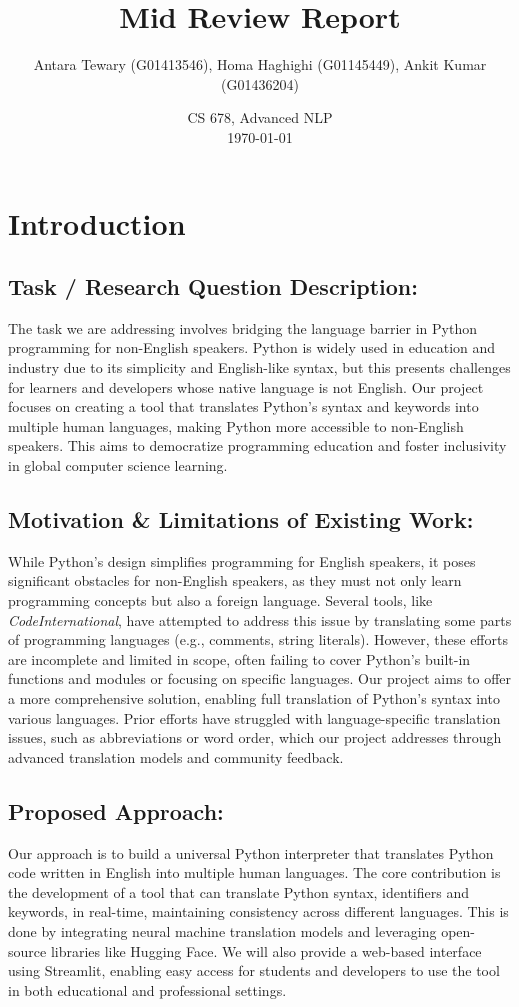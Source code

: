 \documentclass[9pt]{article}
\title{Mid Review Report}
\author{Antara Tewary (G01413546), Homa Haghighi (G01145449), Ankit Kumar (G01436204)}
\date{CS 678, Advanced NLP\\\today}
\begin{document}
\maketitle

\section{Introduction}
\subsection{Task / Research Question Description: }
The task we are addressing involves bridging the language barrier in Python programming for non-English speakers. Python is widely used in education and industry due to its simplicity and English-like syntax, but this presents challenges for learners and developers whose native language is not English. Our project focuses on creating a tool that translates Python's syntax and keywords into multiple human languages, making Python more accessible to non-English speakers. This aims to democratize programming education and foster inclusivity in global computer science learning. 

\subsection{Motivation \& Limitations of Existing Work: }
While Python's design simplifies programming for English speakers, it poses significant obstacles for non-English speakers, as they must not only learn programming concepts but also a foreign language. Several tools, like \textit{CodeInternational}, have attempted to address this issue by translating some parts of programming languages (e.g., comments, string literals). However, these efforts are incomplete and limited in scope, often failing to cover Python's built-in functions and modules or focusing on specific languages. Our project aims to offer a more comprehensive solution, enabling full translation of Python's syntax into various languages. Prior efforts have struggled with language-specific translation issues, such as abbreviations or word order, which our project addresses through advanced translation models and community feedback.

\subsection{Proposed Approach: }
Our approach is to build a universal Python interpreter that translates Python code written in English into multiple human languages. The core contribution is the development of a tool that can translate Python syntax, identifiers and keywords, in real-time, maintaining consistency across different languages. This is done by integrating neural machine translation models and leveraging open-source libraries like Hugging Face. We will also provide a web-based interface using Streamlit, enabling easy access for students and developers to use the tool in both educational and professional settings.  
\end{document}

